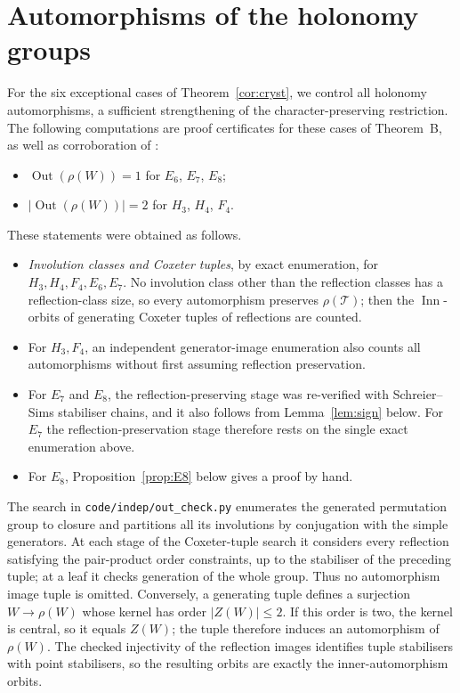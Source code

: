 \documentclass[11pt]{article}
\theoremstyle{definition}
\newcommand{\T}{\mathcal{T}}
\newcommand{\Out}{\operatorname{Out}}
\newcommand{\Inn}{\operatorname{Inn}}
\begin{document}
\section{Automorphisms of the holonomy groups}\label{app:out}

For the six exceptional cases of Theorem~\ref{cor:cryst}, we control all holonomy automorphisms, a sufficient
strengthening of the character-preserving restriction. The following computations are proof certificates
for these cases of Theorem~B, as well as corroboration of \cite[Thm.~31]{FH03}:
\begin{itemize}
\item $\Out(\rho(W))=1$ for $E_6$, $E_7$, $E_8$;
\item $|\Out(\rho(W))|=2$ for $H_3$, $H_4$, $F_4$.
\end{itemize}
These statements were obtained as follows.
\begin{itemize}
\item \emph{Involution classes and Coxeter tuples}, by exact enumeration, for $H_3,H_4,F_4,E_6,E_7$.
No involution class other than the reflection classes has a reflection-class size, so every automorphism preserves
$\rho(\T)$; then the $\Inn$-orbits of generating Coxeter tuples of reflections are counted.
\item For $H_3,F_4$, an independent generator-image enumeration also counts all automorphisms
without first assuming reflection preservation.
\item For $E_7$ and $E_8$, the reflection-preserving stage was re-verified with Schreier--Sims stabiliser chains, and
it also follows from Lemma~\ref{lem:sign} below. For $E_7$ the reflection-preservation stage therefore rests on the
single exact enumeration above.
\item For $E_8$, Proposition~\ref{prop:E8} below gives a proof by hand.
\end{itemize}

The search in \texttt{code/indep/out\_check.py} enumerates the generated permutation group to closure
and partitions all its involutions by conjugation with the simple generators. At each stage of the
Coxeter-tuple search it considers every reflection satisfying the pair-product order constraints,
up to the stabiliser of the preceding tuple; at a leaf it checks generation of the whole group.
Thus no automorphism image tuple is omitted. Conversely, a generating tuple defines a surjection
$W\to\rho(W)$ whose kernel has order $|Z(W)|\le2$. If this order is two, the kernel is central,
so it equals $Z(W)$; the tuple therefore induces an automorphism of $\rho(W)$.
The checked injectivity of the reflection images identifies tuple stabilisers with point stabilisers,
so the resulting orbits are exactly the inner-automorphism orbits.
\end{document}

